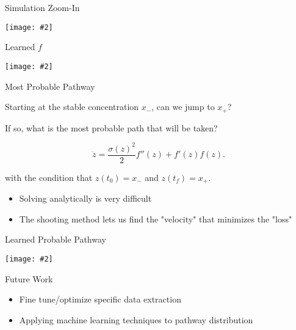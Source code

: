 \documentclass{beamer}
\newcommand {\framedgraphic}[2] {
    \begin{frame}{#1}
        \begin{center}
            \texttt{[image: \#2]}
        \end{center}
    \end{frame}
}
\begin{document}
\framedgraphic{Simulation Zoom-In}{simulation_zoom.pdf}

\framedgraphic{Learned $f$}{f_and_approx.pdf}

\begin{frame}{Most Probable Pathway}

    Starting at the stable concentration $x_-$, can we jump to $x_+$?\pause

    If so, what is the most probable path that will be taken?\pause

    \begin{equation}\label{eq:zm}
        \ddot{z} = \frac{\sigma(z)^2}{2}f''(z) + f'(z)f(z).
    \end{equation}

    with the condition that $z(t_0) = x_-$ and $z(t_f) = x_+$. \pause

    \begin{itemize}
        \item<1-> Solving analytically is very difficult
        \item<2-> The shooting method lets us find the "velocity" that minimizes the "loss"
    \end{itemize}

\end{frame}

\framedgraphic{Learned Probable Pathway}{bio_min_loss.pdf}

\begin{frame}{Future Work}
    \begin{itemize}
        \item Fine tune/optimize specific data extraction
        \item Applying machine learning techniques to pathway distribution
    \end{itemize}
\end{frame}
\end{document}
